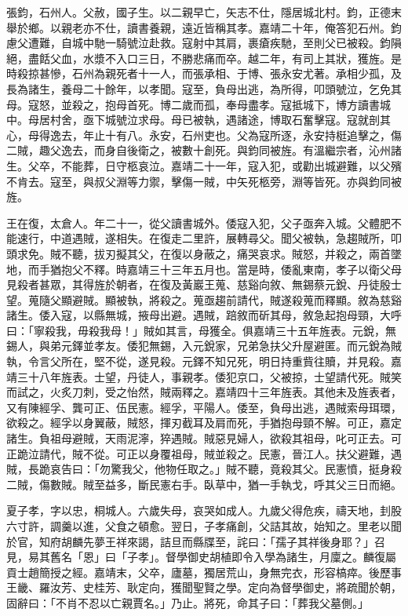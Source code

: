 \begin{pinyinscope}
張鈞，石州人。父赦，國子生。以二親早亡，矢志不仕，隱居城北村。鈞，正德末舉於鄉。以親老亦不仕，讀書養親，遠近皆稱其孝。嘉靖二十年，俺答犯石州。鈞慮父遭難，自城中馳一騎號泣赴救。寇射中其肩，裹瘡疾馳，至則父已被殺。鈞隕絕，盡餂父血，水漿不入口三日，不勝悲痛而卒。越二年，有司上其狀，獲旌。是時殺掠甚慘，石州為親死者十一人，而張承相、于博、張永安尤著。承相少孤，及長為諸生，養母二十餘年，以孝聞。寇至，負母出逃，為所得，叩頭號泣，乞免其母。寇怒，並殺之，抱母首死。博二歲而孤，奉母盡孝。寇抵城下，博方讀書城中。母居村舍，亟下城號泣求母。母已被執，遇諸途，博取石奮擊寇。寇就剖其心，母得逸去，年止十有八。永安，石州吏也。父為寇所逐，永安持梃追擊之，傷二賊，趣父逸去，而身自後衛之，被數十創死。與鈞同被旌。有溫繼宗者，沁州諸生。父卒，不能葬，日守柩哀泣。嘉靖二十一年，寇入犯，或勸出城避難，以父殯不肯去。寇至，與叔父淵等力禦，擊傷一賊，中矢死柩旁，淵等皆死。亦與鈞同被旌。

王在復，太倉人。年二十一，從父讀書城外。倭寇入犯，父子亟奔入城。父體肥不能速行，中道遇賊，遂相失。在復走二里許，展轉尋父。聞父被執，急趨賊所，叩頭求免。賊不聽，拔刃擬其父，在復以身蔽之，痛哭哀求。賊怒，并殺之，兩首墜地，而手猶抱父不釋。時嘉靖三十三年五月也。當是時，倭亂東南，孝子以衛父母見殺者甚眾，其得旌於朝者，在復及黃巖王蒐、慈谿向敘、無錫蔡元銳、丹徒殷士望。蒐隨父顯避賊。顯被執，將殺之。蒐亟趨前請代，賊遂殺蒐而釋顯。敘為慈谿諸生。倭入寇，以縣無城，掖母出避。遇賊，踣敘而斫其母，敘急起抱母頸，大呼曰：「寧殺我，毋殺我母！」賊如其言，母獲全。俱嘉靖三十五年旌表。元銳，無錫人，與弟元鐸並孝友。倭犯無錫，入元銳家，兄弟急扶父升屋避匿。而元銳為賊執，令言父所在，堅不從，遂見殺。元鐸不知兄死，明日持重貲往贖，并見殺。嘉靖三十八年旌表。士望，丹徒人，事親孝。倭犯京口，父被掠，士望請代死。賊笑而試之，火炙刀刺，受之怡然，賊兩釋之。嘉靖四十三年旌表。其他未及旌表者，又有陳經孚、龔可正、伍民憲。經孚，平陽人。倭至，負母出逃，遇賊索母珥環，欲殺之。經孚以身翼蔽，賊怒，揮刃截耳及肩而死，手猶抱母頸不解。可正，嘉定諸生。負祖母避賊，天雨泥濘，猝遇賊。賊惡見婦人，欲殺其祖母，叱可正去。可正跪泣請代，賊不從。可正以身覆祖母，賊並殺之。民憲，晉江人。扶父避難，遇賊，長跪哀告曰：「勿驚我父，他物任取之。」賊不聽，竟殺其父。民憲憤，挺身殺二賊，傷數賊。賊至益多，斷民憲右手。臥草中，猶一手執戈，呼其父三日而絕。

夏子孝，字以忠，桐城人。六歲失母，哀哭如成人。九歲父得危疾，禱天地，刲股六寸許，調羹以進，父食之頓愈。翌日，子孝痛創，父詰其故，始知之。里老以聞於官，知府胡麟先夢王祥來謁，詰旦而縣牒至，詫曰：「孺子其祥後身耶？」召見，易其舊名「恩」曰「子孝」。督學御史胡植即令入學為諸生，月廩之。麟復屬貢士趙簡授之經。嘉靖末，父卒，廬墓，獨居荒山，身無完衣，形容槁瘁。後歷事王畿、羅汝芳、史桂芳、耿定向，獲聞聖賢之學。定向為督學御史，將疏聞於朝，固辭曰：「不肖不忍以亡親賈名。」乃止。將死，命其子曰：「葬我父墓側。」


\end{pinyinscope}
